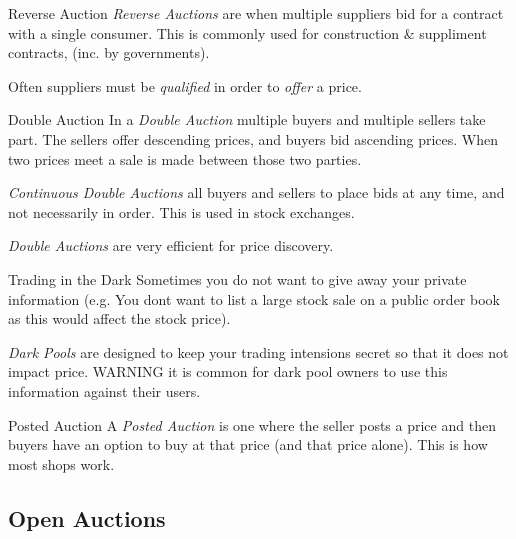 \documentclass[11pt,a4paper]{article}
\begin{document}
\begin{definition}{Reverse Auction}
  \textit{Reverse Auctions} are when multiple suppliers bid for a contract with a single consumer. This is commonly used for construction \& suppliment contracts, (inc. by governments).
  \par Often suppliers must be \textit{qualified} in order to \textit{offer} a price.
\end{definition}

\begin{definition}{Double Auction}
  In a \textit{Double Auction} multiple buyers and multiple sellers take part. The sellers offer descending prices, and buyers bid ascending prices. When two prices meet a sale is made between those two parties.
  \par \textit{Continuous Double Auctions} all buyers and sellers to place bids at any time, and not necessarily in order. This is used in stock exchanges.
  \par \textit{Double Auctions} are very efficient for price discovery.
\end{definition}

\begin{proposition}{Trading in the Dark}
  Sometimes you do not want to give away your private information (e.g. You dont want to list a large stock sale on a public order book as this would affect the stock price).
  \par \textit{Dark Pools} are designed to keep your trading intensions secret so that it does not impact price. WARNING it is common for dark pool owners to use this information against their users.
\end{proposition}

\begin{definition}{Posted Auction}
  A \textit{Posted Auction} is one where the seller posts a price and then buyers have an option to buy at that price (and that price alone). This is how most shops work.
\end{definition}

\subsection{Open Auctions}
\end{document}
